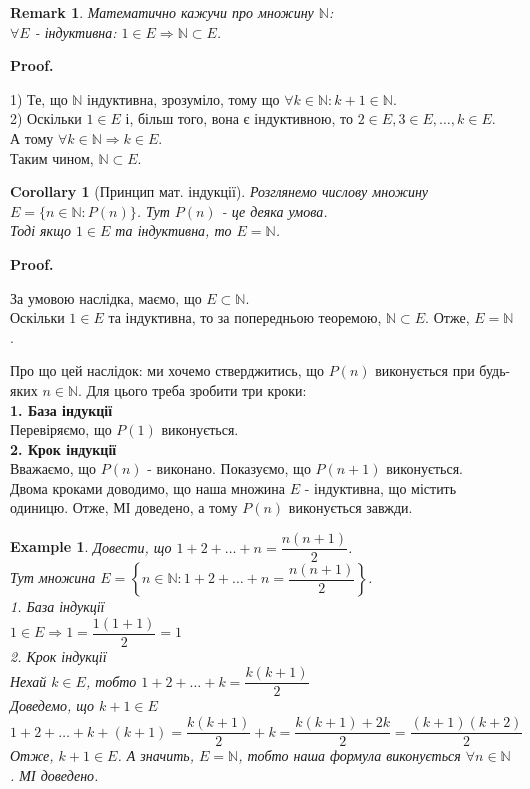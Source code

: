 \documentclass[a4paper, 14pt]{article}
\makeatletter
\def\qed{$\blacksquare$}
\theoremstyle{theoremdd}
\theoremstyle{theoremdd}
\theoremstyle{theoremdd}
\theoremstyle{theoremdd}
\newtheorem{example}[theorem]{Example}
\theoremstyle{theoremdd}
\theoremstyle{theoremdd}
\newtheorem{remark}[theorem]{Remark}
\theoremstyle{theoremdd}
\theoremstyle{theoremdd}
\newtheorem{corollary}[theorem]{Corollary}
\renewenvironment{proof}[1][Proof.\\]{\par
\pushQED{\hfill \qed}%
\normalfont \topsep6\p@\@plus6\p@\relax
\trivlist
\item\relax
{\bfseries
#1\@addpunct{.}}\hspace\labelsep\ignorespaces
}{%
\popQED\endtrivlist\@endpefalse
}
\makeatother
\begin{document}
	\begin{remark}
	Математично кажучи про множину  $\mathbb{N}$:\\
	$\forall E$ - індуктивна: $1 \in E \Rightarrow \mathbb{N} \subset E$.\\
	\end{remark}
	
	\begin{proof}
	1) Те, що $\mathbb{N}$ індуктивна, зрозуміло, тому що $\forall k \in \mathbb{N}: k+1 \in \mathbb{N}$.\\
	2) Оскільки $1 \in E$ і, більш того, вона є індуктивною, то $2 \in E, 3 \in E, \dots, k \in E$.\\
	А тому $\forall k \in \mathbb{N} \Rightarrow k \in E$.\\
	Таким чином, $\mathbb{N} \subset E$.
	\end{proof}
	
	\begin{corollary}[Принцип мат. індукції]
	Розглянемо числову множину $E = \{n \in \mathbb{N}: P(n)\}$. Тут $P(n)$ - це деяка умова.\\
	Тоді якщо $1 \in E$ та індуктивна, то $E = \mathbb{N}$.
	\end{corollary}
	
	\begin{proof}
	За умовою наслідка, маємо, що $E \subset \mathbb{N}$.\\
	Оскільки $1 \in E$ та індуктивна, то за попередньою теоремою, $\mathbb{N} \subset E$. Отже, $E = \mathbb{N}$.
	\end{proof}
	
	Про що цей наслідок: ми хочемо стверджитись, що $P(n)$ виконується при будь-яких $n \in \mathbb{N}$. Для цього треба зробити три кроки:\\
	\textbf{1. База індукції}\\
	Перевіряємо, що $P(1)$ виконується.
	\bigskip \\
	\textbf{2. Крок індукції}\\
	Вважаємо, що $P(n)$ - виконано. Показуємо, що $P(n+1)$ виконується.\\
	Двома кроками доводимо, що наша множина $E$ - індуктивна, що містить одиницю. Отже, МІ доведено, а тому $P(n)$ виконується завжди.
	
	\begin{example}
	Довести, що $1 + 2 + \dots + n = \dfrac{n(n+1)}{2}$.\\
	Тут множина $E = \left\{n \in \mathbb{N}: 1 + 2 + \dots + n = \dfrac{n(n+1)}{2} \right\}$.\\
	1. База індукції\\
	$1 \in E \Rightarrow 1 = \dfrac{1(1+1)}{2} = 1$
	\bigskip \\
	2. Крок індукції\\
	Нехай $k \in E$, тобто 
	$1 + 2 + \dots + k = \dfrac{k(k+1)}{2}$\\
	Доведемо, що $k+1 \in E$\\
	$1+ 2 + \dots + k + (k+1) = \dfrac{k(k+1)}{2} + k = \dfrac{k(k+1)+2k}{2} = \dfrac{(k+1)(k+2)}{2}$\\
	Отже, $k+1 \in E$.
	А значить, $E = \mathbb{N}$, тобто наша формула виконується $\forall n \in \mathbb{N}$. МІ доведено.
	\end{example}
	
\end{document}
